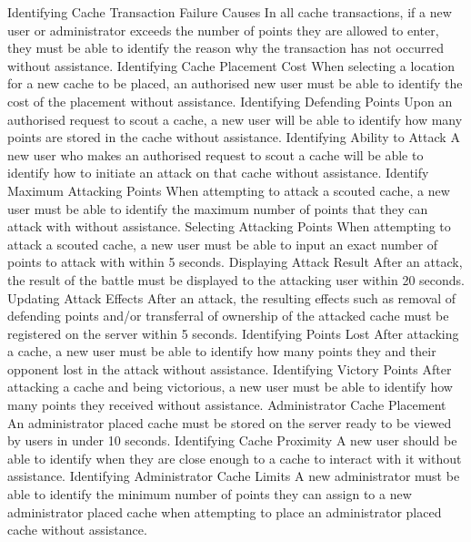 		\nonfuncreq
			{Identifying Cache Transaction Failure Causes}
			{In all cache transactions, if a new user or administrator exceeds
			the number of points they are allowed to enter, they must be able
			to identify the reason why the transaction has not occurred without
			assistance.}
		\nonfuncreq
			{Identifying Cache Placement Cost}
			{When selecting a location for a new cache to be placed, an 
			authorised new user must be able to identify the cost of the 
			placement without assistance.}
		\nonfuncreq
			{Identifying Defending Points}
			{Upon an authorised request to scout a cache, a new user will be
			able to identify how many points are stored in the cache without
			assistance.}
		\nonfuncreq
			{Identifying Ability to Attack}
			{A new user who makes an authorised request to scout a cache will
			be able to identify how to initiate an attack on that cache without
			assistance.}
		\nonfuncreq
			{Identify Maximum Attacking Points}
			{When attempting to attack a scouted cache, a new user must be able
			to identify the maximum number of points that they can attack with
			without assistance.}
		\nonfuncreq
			{Selecting Attacking Points}
			{When attempting to attack a scouted cache, a new user must be able
			to input an exact number of points to attack with within 5
			seconds.}
		\nonfuncreq
			{Displaying Attack Result}
			{After an attack, the result of the battle must be displayed to the
			attacking user within 20 seconds.}
		\nonfuncreq
			{Updating Attack Effects}
			{After an attack, the resulting effects such as removal of
			defending points and/or transferral of ownership of the	attacked
			cache must be registered on the server within 5 seconds.}
		\nonfuncreq
			{Identifying Points Lost}
			{After attacking a cache, a new user must be able to identify how
			many points they and their opponent lost in the attack without
			assistance.}
		\nonfuncreq
			{Identifying Victory Points}
			{After attacking a cache and being victorious, a new user must be
			able to identify how many points they received without assistance.}
		\nonfuncreq
			{Administrator Cache Placement}
			{An administrator placed cache must be stored on the server ready
			to be viewed by users in under 10 seconds.}
		\nonfuncreq
			{Identifying Cache Proximity}
			{A new user should be able to identify when they are close enough
			to a cache to interact with it without assistance.}
		\nonfuncreq
			{Identifying Administrator Cache Limits}
			{A new administrator must be able to identify the minimum number of
			points they can assign to a new administrator placed cache when
			attempting to place an administrator placed cache without
			assistance.}
